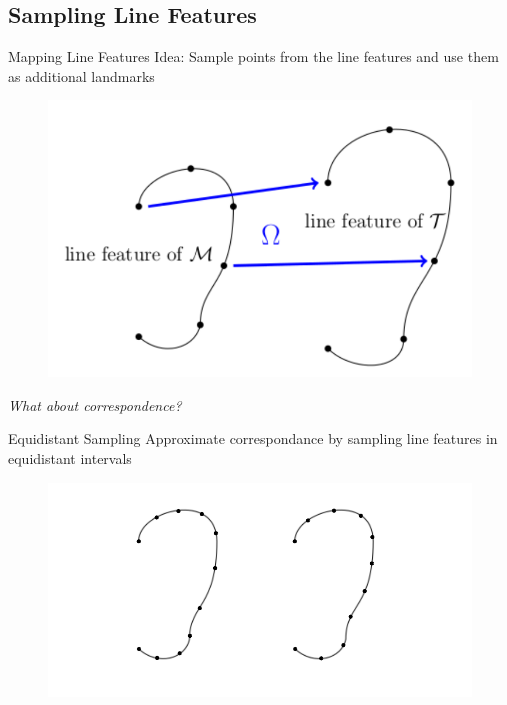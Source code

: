 \documentclass[xcolor=x11names,compress]{beamer}
\begin{document}
    \subsection{Sampling Line Features}
    \begin{frame}{Mapping Line Features}
        Idea: Sample points from the line features and use them as additional landmarks
        \begin{figure}
            \centering
            \includegraphics[width=.5\textwidth]{../resources/img/linefeaturemapping.pdf}
        \end{figure}
        \textit{What about correspondence?}
    \end{frame}

    \begin{frame}{Equidistant Sampling}
        Approximate correspondance by sampling line features in equidistant intervals
        \begin{figure}
            \centering
            \includegraphics[width=.7\textwidth]{../resources/figures/ears_diffparam.pdf}
        \end{figure}
    \end{frame}
\end{document}
